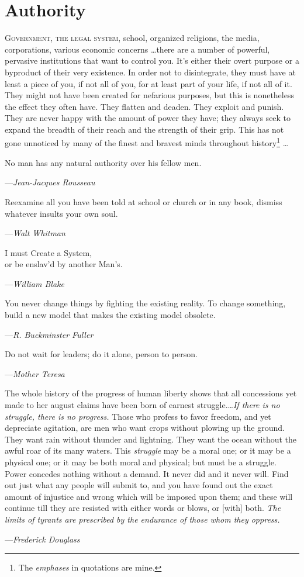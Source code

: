 \documentclass{article}
\begin{document}
\renewcommand{\epigraphsize}{\small}
\setlength{\epigraphwidth}{1.0\textwidth}

\section {Authority}

\lettrine[lines=2]{G}{overnment, the legal system,} school, organized religions, the media, corporations, various economic concerns \dots there are a number of powerful, pervasive institutions that want to control you. It's either their overt purpose or a byproduct of their very existence. In order not to disintegrate, they must have at least a piece of you, if not all of you, for at least part of your life, if not all of it. They might not have been created for nefarious purposes, but this is nonetheless the effect they often have. They flatten and deaden. They exploit and punish. They are never happy with the amount of power they have; they always seek to expand the breadth of their reach and the strength of their grip. This has not gone unnoticed by many of the finest and bravest minds throughout history\footnote{The \emph{emphases} in quotations are mine.} \dots

\epigraph
{
    No man has any natural authority over his fellow men.
}
{
    ---\textit{Jean-Jacques Rousseau}
}
\epigraph
{
    Reexamine all you have been told at school or church or in any book, dismiss whatever insults your own soul.
}
{
    ---\textit{Walt Whitman}
}
\epigraph
{
    I must Create a System,\\
    or be enslav'd by another Man's.
}
{
    ---\textit{William Blake}
}
\epigraph
{
    You never change things by fighting the existing reality. To change something, build a new model that makes the existing model obsolete.
}
{
    ---\textit{R. Buckminster Fuller}
}
\epigraph
{
    Do not wait for leaders; do it alone, person to person.
}
{
    ---\textit{Mother Teresa}
}
\epigraph
{
    The whole history of the progress of human liberty shows that all concessions yet made to her august claims have been born of earnest struggle.\dots \emph{If there is no struggle, there is no progress.} Those who profess to favor freedom, and yet depreciate agitation, are men who want crops without plowing up the ground. They want rain without thunder and lightning. They want the ocean without the awful roar of its many waters. This \emph{struggle} may be a moral one; or it may be a physical one; or it may be both moral and physical; but must be a struggle. Power concedes nothing without a demand. It never did and it never will. Find out just what any people will submit to, and you have found out the exact amount of injustice and wrong which will be imposed upon them; and these will continue till they are resisted with either words or blows, or [with] both. \emph{The limits of tyrants are prescribed by the endurance of those whom they oppress.}
}
{
    ---\textit{Frederick Douglass}
}
\end{document}
